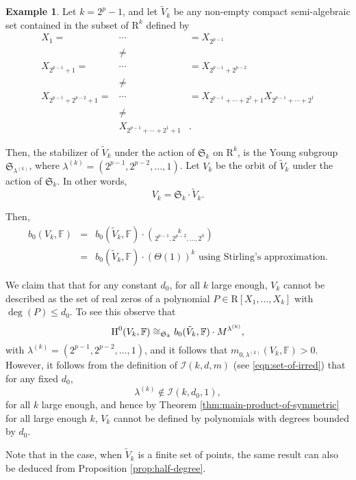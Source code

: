 \documentclass{amsart}
\theoremstyle{definition}
\newtheorem{example}{Example}
\theoremstyle{remark}
\numberwithin{equation}{section}
\begin{document}
 \begin{example}
 \label{eg:lower-bound}
 Let $k = 2^p-1$, and let 
 $\tilde{V}_k$ be any non-empty compact semi-algebraic set contained in the subset of ${\mathrm{R}}^k$ defined by
 \begin{eqnarray*}
  X_1=&\cdots &=X_{2^{p-1}}  \\
  &\neq& \\
   X_{2^{p-1}+1} = &\cdots& = X_{2^{p-1}+2^{p-2}} \\
    &\neq&\\
  X_{2^{p-1}+2^{p-2}+1} = &\cdots& =  X_{2^{p-1}+\cdots+2^2+1} X_{2^{p-1}+\cdots+2^1} \\
   &\neq& \\
   &X_{2^{p-1}+\cdots+2^1+1}&.
  \end{eqnarray*}
  
Then, the stabilizer of $\tilde{V}_k$ under the action of $\mathfrak{S}_k$ on ${\mathrm{R}}^k$, is the
Young subgroup $\mathfrak{S}_{\lambda^{(k)}}$, where $\lambda^{(k)} = (2^{p-1},2^{p-2},\ldots,1)$.
Let $V_k$ be the orbit of $\tilde{V}_k$ under the action of $\mathfrak{S}_k$. In other words,
\[
V_k  = \mathfrak{S}_k \cdot \tilde{V}_k.
\]
 
 
Then, 
\begin{eqnarray*}
b_0(V_k,{\mathbb{F}}) & = &  b_0(\tilde{V}_k,{\mathbb{F}}) \cdot \binom{k}{2^{p-1}, 2^{p-2},\ldots,2^0}  \\
               &=&  b_0(\tilde{V}_k,{\mathbb{F}}) \cdot (\Theta(1))^k \mbox{ using Stirling's approximation}.
\end{eqnarray*}

We claim that that for any constant $d_0$, for  all $k$ large enough, $V_k$ cannot be described as the
set of real zeros of a polynomial $P \in {\mathrm{R}}[X_1,\ldots,X_k]$ with $\deg(P) \leq d_0$.
To see this observe that 
\[
{\mbox{\rm H}}^0(V_k,{\mathbb{F}}) \cong_{\mathfrak{S}_k} b_0(\tilde{V}_k,{\mathbb{F}}) \cdot M^{\lambda^{(k)}},
\]
with  $\lambda^{(k)}= (2^{p-1},2^{p-2},\ldots,1)$, and it follows that
$m_{0,\lambda^{(k)}}(V_k,{\mathbb{F}}) > 0$. However, it follows from  the definition of 
$\mathcal{I}(k,d,m)$  (see \eqref{eqn:set-of-irred})
that for any fixed $d_0$,
\[
\lambda^{(k)} \not\in \mathcal{I}(k,d_0,1),
\]
for all $k$ large enough, and hence by Theorem \ref{thm:main-product-of-symmetric}
for all large enough $k$, $V_k$ cannot be defined by polynomials with degrees bounded by $d_0$. 

Note that
in the case, when $\tilde{V}_k$ is a finite set of points, the same result can also be deduced from 
Proposition \ref{prop:half-degree}.
\end{example} 
\end{document}
